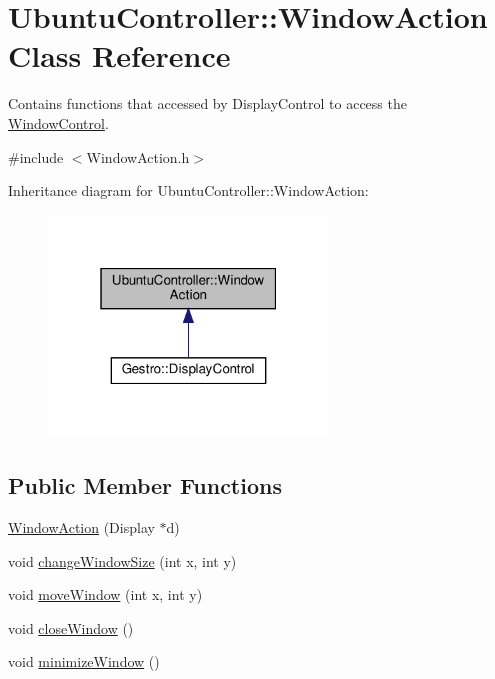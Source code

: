 \hypertarget{classUbuntuController_1_1WindowAction}{}\section{Ubuntu\+Controller\+:\+:Window\+Action Class Reference}
\label{classUbuntuController_1_1WindowAction}


Contains functions that accessed by Display\+Control to access the \hyperlink{classUbuntuController_1_1WindowControl}{Window\+Control}.  




{\ttfamily \#include $<$Window\+Action.\+h$>$}



Inheritance diagram for Ubuntu\+Controller\+:\+:Window\+Action\+:
\nopagebreak
\begin{figure}[H]
\begin{center}
\leavevmode
\includegraphics[width=211pt]{classUbuntuController_1_1WindowAction__inherit__graph}
\end{center}
\end{figure}
\subsection*{Public Member Functions}
\begin{DoxyCompactItemize}
\item 
\hyperlink{classUbuntuController_1_1WindowAction_a1836cf300ad545fa88f33454d09765e1}{Window\+Action} (Display $\ast$d)
\item 
void \hyperlink{classUbuntuController_1_1WindowAction_ac7145d79c3b902a716d554d09e6e2a63}{change\+Window\+Size} (int x, int y)
\item 
void \hyperlink{classUbuntuController_1_1WindowAction_ae79c374bbbc84ff3dfb8565ede5f4220}{move\+Window} (int x, int y)
\item 
void \hyperlink{classUbuntuController_1_1WindowAction_a99150ce49f2956c56e64b6ba0246424f}{close\+Window} ()
\item 
void \hyperlink{classUbuntuController_1_1WindowAction_aa6f2b2543505c0c44027b501f151d4bf}{minimize\+Window} ()
\end{DoxyCompactItemize}


